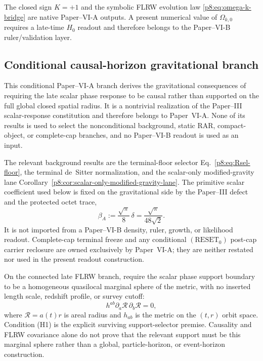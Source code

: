 \documentclass[12pt,a4paper]{article}
\begin{document}
\begin{remark}
The closed sign \(K=+1\) and the symbolic FLRW evolution law \eqref{p8:eq:omega-k-bridge} are native Paper--VI-A outputs.  A present numerical value of \(\Omega_{k,0}\) requires a late-time \(H_0\) readout and therefore belongs to the Paper--VI-B ruler/validation layer.
\end{remark}

\subsection{Conditional causal-horizon gravitational branch}
\label{p8:app:horizon-supported-relaxation}

This conditional Paper--VI-A branch derives the gravitational consequences of requiring the late scalar phase response to be causal rather than supported on the full global closed spatial radius.  It is a nontrivial realization of the Paper--III scalar-response constitution and therefore belongs to Paper~VI-A.  None of its results is used to select the nonconditional background, static RAR, compact-object, or complete-cap branches, and no Paper--VI-B readout is used as an input.

The relevant background results are the terminal-floor selector
Eq.~\eqref{p8:eq:Rsel-floor}, the terminal de~Sitter normalization, and the
scalar-only modified-gravity lane
Corollary~\ref{p8:cor:scalar-only-modified-gravity-lane}.  The primitive scalar coefficient used below is fixed on the gravitational side by the Paper--III defect and the protected octet trace,
\[
\beta_A:=\frac{\sqrt\pi}{8}\,\delta=\frac{\sqrt\pi}{48\sqrt2}.
\]
It is not imported from a Paper--VI-B density, ruler, growth, or likelihood
readout.  Complete-cap terminal freeze and any conditional
\((\mathrm{RESET}_0)\) post-cap carrier reclosure are owned exclusively by
Paper~VI-A; they are neither restated nor used in the present readout
construction.

\begin{definition}
\label{p8:def:horizon-supported-scalar-phase-response}
On the connected late FLRW branch, require the scalar phase support boundary to be a homogeneous quasilocal marginal sphere of the metric, with no inserted length scale, redshift profile, or survey cutoff:
\begin{equation}
\label{p8:eq:H1-quasilocal-support}
\tag{H1}
h^{ab}\partial_a\mathcal R\,\partial_b\mathcal R=0,
\end{equation}
where $\mathcal R=a(t)r$ is areal radius and $h_{ab}$ is the metric on the $(t,r)$ orbit space.  Condition (H1) is the explicit surviving support-selector premise.  Causality and FLRW covariance alone do not prove that the relevant support must be this marginal sphere rather than a global, particle-horizon, or event-horizon construction.
\end{definition}
\end{document}
